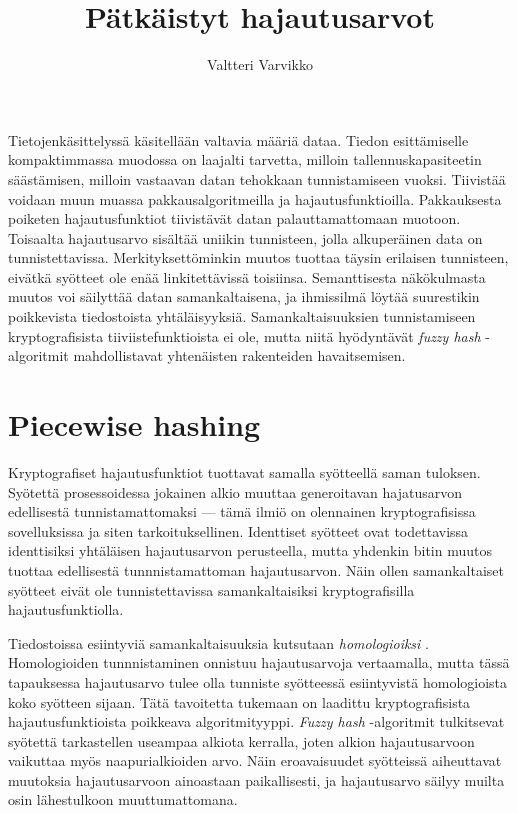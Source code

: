 \documentclass[10pt]{article}
\title{Pätkäistyt hajautusarvot}
\author{Valtteri Varvikko}
\begin{document}
	\maketitle

	Tietojenkäsittelyssä käsitellään valtavia määriä dataa. Tiedon esittämiselle kompaktimmassa
	muodossa on laajalti tarvetta, milloin tallennuskapasiteetin säästämisen, milloin vastaavan
	datan tehokkaan tunnistamiseen vuoksi. Tiivistää voidaan muun muassa pakkausalgoritmeilla ja
	hajautusfunktioilla. 
	Pakkauksesta poiketen hajautusfunktiot tiivistävät datan palauttamattomaan muotoon.
	Toisaalta hajautusarvo sisältää uniikin tunnisteen, jolla
	alkuperäinen data on tunnistettavissa. Merkityksettöminkin muutos tuottaa täysin erilaisen
	tunnisteen, eivätkä syötteet ole enää linkitettävissä toisiinsa.
	Semanttisesta näkökulmasta muutos voi säilyttää datan samankaltaisena,
	ja ihmissilmä löytää suurestikin poikkevista tiedostoista yhtäläisyyksiä.
	Samankaltaisuuksien tunnistamiseen kryptografisista tiiviistefunktioista ei ole,
	mutta niitä hyödyntävät \textit{fuzzy hash} -algoritmit mahdollistavat
	yhtenäisten rakenteiden havaitsemisen.

	\section*{Piecewise hashing}

	Kryptografiset hajautusfunktiot tuottavat samalla syötteellä saman tuloksen.
	Syötettä prosessoidessa jokainen alkio muuttaa generoitavan hajatusarvon
	edellisestä tunnistamattomaksi --- tämä ilmiö on olennainen kryptografisissa sovelluksissa
	ja siten tarkoituksellinen.
	Identtiset syötteet ovat todettavissa identtisiksi yhtäläisen hajautusarvon
	perusteella, mutta yhdenkin bitin muutos tuottaa edellisestä tunnnistamattoman
	hajautusarvon. Näin ollen samankaltaiset syötteet eivät ole tunnistettavissa
	samankaltaisiksi kryptografisilla hajautusfunktiolla.

	Tiedostoissa esiintyviä samankaltaisuuksia kutsutaan
	\textit{homologioiksi} \parencite{IDENT}. Homologioiden tunnnistaminen onnistuu hajautusarvoja
	vertaamalla, mutta tässä tapauksessa hajautusarvo tulee olla tunniste 
	syötteessä esiintyvistä homologioista koko syötteen sijaan.
	Tätä tavoitetta tukemaan on laadittu kryptografisista hajautusfunktioista
	poikkeava algoritmityyppi. \textit{Fuzzy hash} -algoritmit tulkitsevat
	syötettä tarkastellen useampaa alkiota kerralla, joten alkion
	hajautusarvoon vaikuttaa myös naapurialkioiden arvo. Näin eroavaisuudet
	syötteissä aiheuttavat muutoksia hajautusarvoon ainoastaan paikallisesti,
	ja hajautusarvo säilyy muilta osin lähestulkoon muuttumattomana.
\end{document}

